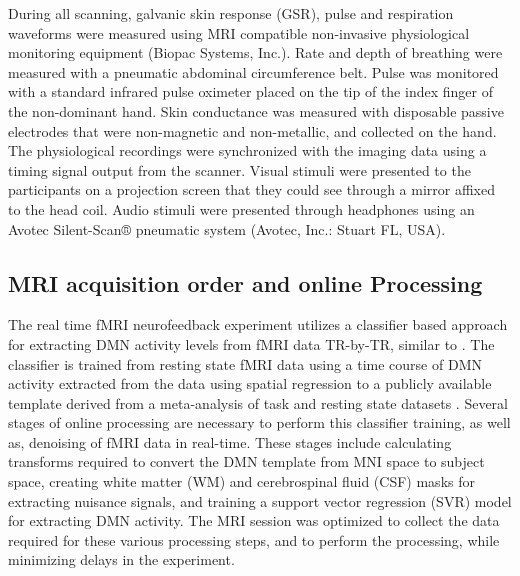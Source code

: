 During all scanning, galvanic skin response (GSR), pulse and respiration waveforms were measured using MRI compatible non-invasive physiological monitoring equipment (Biopac Systems, Inc.). Rate and depth of breathing were measured with a pneumatic abdominal circumference belt. Pulse was monitored with a standard infrared pulse oximeter placed on the tip of the index finger of the non-dominant hand. Skin conductance was measured with disposable passive electrodes that were non-magnetic and non-metallic, and collected on the hand. The physiological recordings were synchronized with the imaging data using a timing signal output from the scanner. Visual stimuli were presented to the participants on a projection screen that they could see through a mirror affixed to the head coil. Audio stimuli were presented through headphones using an Avotec Silent-Scan® pneumatic system (Avotec, Inc.: Stuart FL, USA).

\subsection{MRI acquisition order and online Processing}

The real time fMRI neurofeedback experiment utilizes a classifier based approach for extracting DMN activity levels from fMRI data TR-by-TR, similar to \cite{Craddock2012}. The classifier is trained from resting state fMRI data using a time course of DMN activity extracted from the data using spatial regression to a publicly available template derived from a meta-analysis of task and resting state datasets \cite{Smith2009,fmrib_RSNS}. Several stages of online processing are necessary to perform this classifier training, as well as, denoising of fMRI data in real-time. These stages include calculating transforms required to convert the DMN template from MNI space to subject space, creating white matter (WM) and cerebrospinal fluid (CSF) masks for extracting nuisance signals, and training a support vector regression (SVR) model for extracting DMN activity. The MRI session was optimized to collect the data required for these various processing steps, and to perform the processing, while minimizing delays in the experiment.


